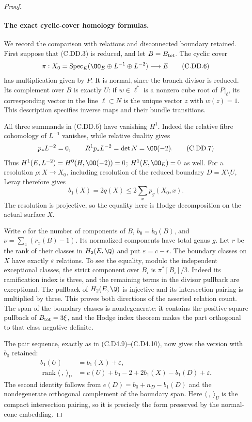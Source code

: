 \begin{proof}
\paragraph{The exact cyclic-cover homology formulas.}
We record the comparison with relations and disconnected
boundary retained. First suppose that (C.DD.3) is reduced,
and let $B=B_{\rm tot}$. The cyclic cover
\[
 \pi:X_0=\operatorname{Spec}_E
       (\OO_E\oplus L^{-1}\oplus L^{-2})\longrightarrow E
\tag{C.DD.6}
\]
has multiplication given by $P$. It is normal, since
the branch divisor is reduced. Its complement over
$B$ is exactly $U$: if $w\in\ell^*$ is a nonzero
cube root of $P|_\ell$, its corresponding vector in
the line $\ell\subset N$ is the unique vector $z$
with $w(z)=1$. This description specifies inverse
maps and their bundle transitions.

All three summands in (C.DD.6) have vanishing $H^1$.
Indeed the relative fibre cohomology of $L^{-1}$
vanishes, while relative duality gives
\[
 p_*L^{-2}=0,\qquad R^1p_*L^{-2}=\det N=\OO(-2).
\tag{C.DD.7}
\]
Thus $H^1(E,L^{-2})=H^0(H,\OO(-2))=0$;
$H^1(E,\OO_E)=0$ as well. For a resolution
$\rho:X\to X_0$, including resolution of the reduced
boundary $D=X\setminus U$, Leray therefore gives
\[
 b_1(X)=2q(X)\le2\sum_x p_g(X_0,x).
\tag{C.DD.8}
\]
The resolution is projective, so the equality here
is Hodge decomposition on the actual surface $X$.

Write $c$ for the number of components of $B$,
$b_0=b_0(B)$, and
$\nu=\sum_x(r_x(B)-1)$. Its normalized components
have total genus $g$. Let $r$ be the rank of their
classes in $H_2(E,\Q)$ and put $\varepsilon=c-r$.
The boundary classes on $X$ have exactly
$\varepsilon$ relations. To see the equality, modulo
the independent exceptional classes, the strict
component over $B_i$ is $\pi^*[B_i]/3$.
Indeed its ramification index is three, and the
remaining terms in the divisor pullback are exceptional.
The pullback of $H_2(E,\Q)$ is injective and its
intersection pairing is multiplied by three.
This proves both directions of the asserted relation
count. The span of the boundary classes is
nondegenerate: it contains the positive-square
pullback of $B_{\rm tot}=3\xi$, and the Hodge index
theorem makes the part orthogonal to that class
negative definite.

The pair sequence, exactly as in (C.D4.9)--(C.D4.10),
now gives the version with $b_0$ retained:
\[
\begin{split}
 b_1(U)&=b_1(X)+\varepsilon,\\
 \operatorname{rank}\langle\ ,\ \rangle_U
 &=e(U)+b_0-2+2b_1(X)-b_1(D)+\varepsilon.
\end{split}
\tag{C.DD.9}
\]
The second identity follows from
$e(D)=b_0+n_D-b_1(D)$ and the nondegenerate
orthogonal complement of the boundary span. Here
$\langle\ ,\ \rangle_U$ is the compact intersection
pairing, so it is precisely the form preserved by
the normal-cone embedding.


\end{proof}
